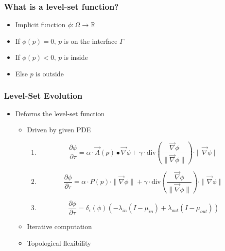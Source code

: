 \documentclass[18pt]{beamer}
\begin{document}
\begin{frame}
\frametitle{What is a level-set function?}
\begin{itemize}
\item Implicit function $\phi : \Omega \rightarrow \mathbb{R}$
\item If $\phi(p) = 0$, $p$ is on the interface $\Gamma$
\item If $\phi(p) < 0$, $p$ is inside
\item Else $p$ is outside
\end{itemize}
\end{frame}


\begin{frame}
 \frametitle{Level-Set Evolution}
\begin{itemize}
  \item Deforms the level-set function
  \begin{itemize}
    \item Driven by given PDE
    \begin{enumerate}
      \item<2->[yo1]
      \begin{equation*}
      \frac{\partial \phi}{\partial \tau} = 
      \alpha \cdot \overrightarrow{A}(p) \bullet \overrightarrow{\nabla} \phi +
      \gamma \cdot \text{div}\left( \frac{\overrightarrow{\nabla}
      \phi}{\|\overrightarrow{\nabla} \phi\|} \right) \cdot
    \|\overrightarrow{\nabla}
      \phi\|
      \end{equation*}
      \item<3->[yo2]
      \begin{equation*}
      \frac{\partial \phi}{\partial \tau} = 
      \alpha \cdot P(p) \cdot \|\overrightarrow{\nabla} \phi \| +
      \gamma \cdot \text{div}\left( \frac{\overrightarrow{\nabla}
      \phi}{\|\overrightarrow{\nabla} \phi\|} \right) \cdot
    \|\overrightarrow{\nabla}
      \phi\|
      \end{equation*}
      \item<4->[yo3]
      \begin{equation*}
      \frac{\partial \phi}{\partial \tau} = \delta_{\epsilon}(\phi) 
      \left(
      - \lambda_{in} \left( I - \mu_{in} \right) + 
      \lambda_{out} \left( I - \mu_{out} \right)
      \right)
      \end{equation*}
    \end{enumerate}
    \item<5-> Iterative computation
    \item<6> Topological flexibility
  \end{itemize}
\end{itemize}
\end{frame}
\end{document}
